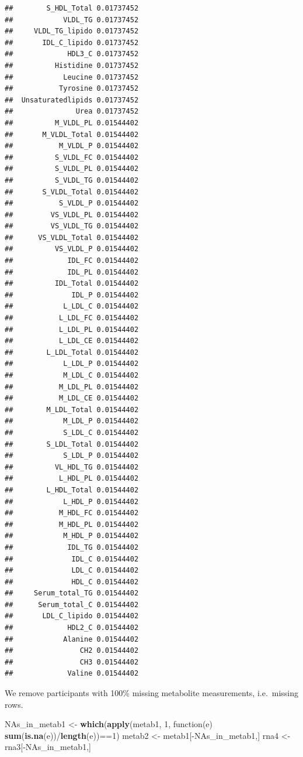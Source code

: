 \documentclass[]{article}
\newenvironment{Shaded}{\begin{snugshade}}{\end{snugshade}}
\newcommand{\KeywordTok}[1]{\textcolor[rgb]{0.13,0.29,0.53}{\textbf{{#1}}}}
\newcommand{\DecValTok}[1]{\textcolor[rgb]{0.00,0.00,0.81}{{#1}}}
\newcommand{\StringTok}[1]{\textcolor[rgb]{0.31,0.60,0.02}{{#1}}}
\newcommand{\NormalTok}[1]{{#1}}
\begin{document}
\begin{verbatim}
##        S_HDL_Total 0.01737452
##            VLDL_TG 0.01737452
##     VLDL_TG_lipido 0.01737452
##       IDL_C_lipido 0.01737452
##             HDL3_C 0.01737452
##          Histidine 0.01737452
##            Leucine 0.01737452
##           Tyrosine 0.01737452
##  Unsaturatedlipids 0.01737452
##               Urea 0.01737452
##          M_VLDL_PL 0.01544402
##       M_VLDL_Total 0.01544402
##           M_VLDL_P 0.01544402
##          S_VLDL_FC 0.01544402
##          S_VLDL_PL 0.01544402
##          S_VLDL_TG 0.01544402
##       S_VLDL_Total 0.01544402
##           S_VLDL_P 0.01544402
##         VS_VLDL_PL 0.01544402
##         VS_VLDL_TG 0.01544402
##      VS_VLDL_Total 0.01544402
##          VS_VLDL_P 0.01544402
##             IDL_FC 0.01544402
##             IDL_PL 0.01544402
##          IDL_Total 0.01544402
##              IDL_P 0.01544402
##            L_LDL_C 0.01544402
##           L_LDL_FC 0.01544402
##           L_LDL_PL 0.01544402
##           L_LDL_CE 0.01544402
##        L_LDL_Total 0.01544402
##            L_LDL_P 0.01544402
##            M_LDL_C 0.01544402
##           M_LDL_PL 0.01544402
##           M_LDL_CE 0.01544402
##        M_LDL_Total 0.01544402
##            M_LDL_P 0.01544402
##            S_LDL_C 0.01544402
##        S_LDL_Total 0.01544402
##            S_LDL_P 0.01544402
##          VL_HDL_TG 0.01544402
##           L_HDL_PL 0.01544402
##        L_HDL_Total 0.01544402
##            L_HDL_P 0.01544402
##           M_HDL_FC 0.01544402
##           M_HDL_PL 0.01544402
##            M_HDL_P 0.01544402
##             IDL_TG 0.01544402
##              IDL_C 0.01544402
##              LDL_C 0.01544402
##              HDL_C 0.01544402
##     Serum_total_TG 0.01544402
##      Serum_total_C 0.01544402
##       LDL_C_lipido 0.01544402
##             HDL2_C 0.01544402
##            Alanine 0.01544402
##                CH2 0.01544402
##                CH3 0.01544402
##             Valine 0.01544402
\end{verbatim}

We remove participants with 100\% missing metabolite measurements,
i.e.~missing rows.

\begin{Shaded}
\begin{Highlighting}[]
\NormalTok{NAs_in_metab1 <-}\StringTok{ }\KeywordTok{which}\NormalTok{(}\KeywordTok{apply}\NormalTok{(metab1, }\DecValTok{1}\NormalTok{, function(e) }\KeywordTok{sum}\NormalTok{(}\KeywordTok{is.na}\NormalTok{(e))/}\KeywordTok{length}\NormalTok{(e))==}\DecValTok{1}\NormalTok{)}
\NormalTok{metab2 <-}\StringTok{ }\NormalTok{metab1[-NAs_in_metab1,]}
\NormalTok{rna4 <-}\StringTok{ }\NormalTok{rna3[-NAs_in_metab1,]}
\end{Highlighting}
\end{Shaded}
\end{document}
